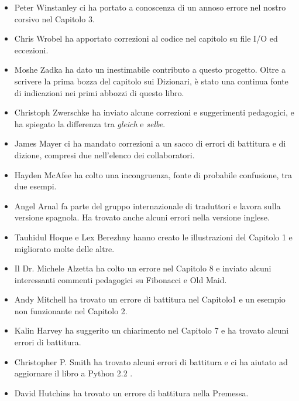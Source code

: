 \documentclass[10pt]{book}
\begin{document}
\begin{itemize}
\item Peter Winstanley ci ha portato a conoscenza di un annoso errore nel nostro corsivo nel Capitolo 3.

\item Chris Wrobel ha apportato correzioni al codice nel capitolo su file I/O ed eccezioni. 

\item Moshe Zadka ha dato un inestimabile contributo a questo progetto. Oltre a scrivere la prima bozza del capitolo sui Dizionari, è stato una continua fonte di indicazioni nei primi abbozzi di questo libro.

\item Christoph Zwerschke ha inviato alcune correzioni e suggerimenti pedagogici, e ha spiegato la differenza tra {\em gleich} e {\em selbe}.

\item James Mayer ci ha mandato correzioni a un sacco di errori di battitura e di dizione, compresi due nell'elenco dei collaboratori.

\item Hayden McAfee ha colto una incongruenza, fonte di probabile confusione, tra due esempi.

\item Angel Arnal fa parte del gruppo internazionale di traduttori e lavora sulla versione spagnola. Ha trovato anche alcuni errori nella versione inglese.

\item Tauhidul Hoque e Lex Berezhny hanno creato le illustrazioni del Capitolo 1 e migliorato molte delle altre.

\item Il Dr. Michele Alzetta ha colto un errore nel Capitolo 8 e inviato alcuni interessanti commenti pedagogici su Fibonacci e Old Maid.

\item Andy Mitchell ha trovato un errore di battitura nel Capitolo1 e un esempio non funzionante nel Capitolo 2.

\item Kalin Harvey ha suggerito un chiarimento nel Capitolo 7 e ha trovato alcuni errori di battitura.

\item Christopher P. Smith ha trovato alcuni errori di battitura e ci ha aiutato ad aggiornare il libro a Python 2.2 .

\item David Hutchins ha trovato un errore di battitura nella Premessa.


\end{itemize}
\end{document}
